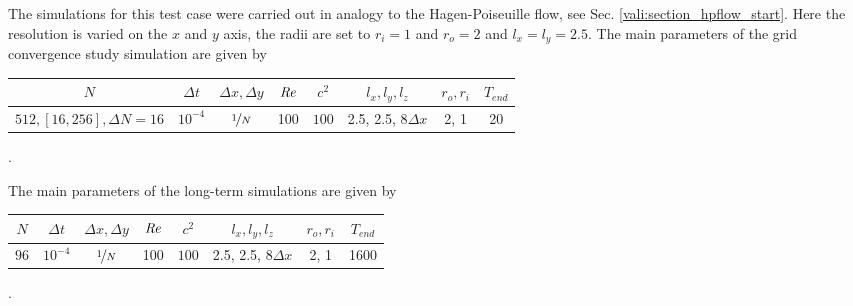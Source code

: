 The simulations for this test case were carried out in analogy to the Hagen-Poiseuille flow, see Sec. \ref{vali:section_hpflow_start}.
Here the resolution is varied on the $x$ and $y$ axis, the radii are set to $r_i=1$ and $r_o=2$ and $l_x=l_y=2.5$.
The main parameters of the grid convergence study simulation are  given by

\begin{center}
\vspace*{0.7ex}
\begin{tabular}{c|c|c|c|c|c|c|c }
 $ N  $                   & $\Delta t$ & $\Delta x, \Delta y$            & $\mbox{\textit{Re}}$  & $c^2$   & $l_x, l_y, l_z$ & $r_o, r_i$ & $T_{end}$\\
\hline
 $512, [16, 256], \Delta N = 16 $& $10^{-4}$ & $\nicefrac{1}{N}$ & 100     & $100$   & 2.5, 2.5, 8$\Delta x$ & 2, 1    & 20\\
\end{tabular}.
\vspace*{0.7ex}
\end{center}

The main parameters of the long-term simulations are  given by

\begin{center}
\vspace*{0.7ex}
\begin{tabular}{c|c|c|c|c|c|c|c }
 $ N  $                   & $\Delta t$ & $\Delta x, \Delta y$            & $\mbox{\textit{Re}}$  & $c^2$   & $l_x, l_y, l_z$ &$r_o, r_i$ & $T_{end}$\\
\hline
 $96 $& $10^{-4}$ & $\nicefrac{1}{N}$ & 100     & $100$   & 2.5, 2.5, 8$\Delta x$   & 2, 1& 1600\\
\end{tabular}.
\vspace*{0.7ex}
\end{center}

